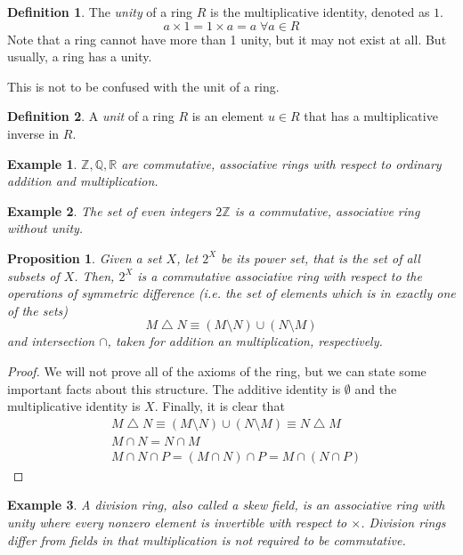 \documentclass{article}
\newtheorem{proposition}[theorem]{Proposition}
\newtheorem{example}{Example}[section]
\theoremstyle{remark}
\theoremstyle{definition}
\newtheorem{definition}{Definition}[section]
\begin{document}
\begin{definition}
The \textit{unity} of a ring $R$ is the multiplicative identity, denoted as $1$. 
\[a \times 1 = 1 \times a = a \; \forall a \in R \]
Note that a ring cannot have more than 1 unity, but it may not exist at all. But usually, a ring has a unity.
\end{definition}

This is not to be confused with the unit of a ring. 

\begin{definition}
A \textit{unit} of a ring $R$ is an element $u \in R$ that has a multiplicative inverse in $R$. 
\end{definition}

\begin{example}
$\mathbb{Z}, \mathbb{Q}, \mathbb{R}$ are commutative, associative rings with respect to ordinary addition and multiplication.
\end{example}

\begin{example}
The set of even integers $2\mathbb{Z}$ is a commutative, associative ring without unity.
\end{example}

\begin{proposition}
Given a set $X$, let $2^X$ be its power set, that is the set of all subsets of $X$. Then, $2^X$ is a commutative associative ring with respect to the operations of symmetric difference (i.e. the set of elements which is in exactly one of the sets) 
\[ M \bigtriangleup N \equiv (M \setminus N) \cup (N \setminus M) \]
and intersection $\cap$, taken for addition an multiplication, respectively. 
\end{proposition}
\begin{proof}
We will not prove all of the axioms of the ring, but we can state some important facts about this structure. The additive identity is $\emptyset$ and the multiplicative identity is $X$. Finally, it is clear that 
\begin{align*}
    & M \bigtriangleup N \equiv (M \setminus N) \cup (N \setminus M) \equiv N \bigtriangleup M \\
    & M \cap N = N \cap M \\
    & M \cap N \cap P = (M \cap N) \cap P = M \cap (N \cap P)
\end{align*}
\end{proof}

\begin{example}
A \textit{division ring}, also called a \textit{skew field}, is an associative ring with unity where every nonzero element is invertible with respect to $\times$. Division rings differ from fields in that multiplication is not required to be commutative. 
\end{example}
\end{document}
